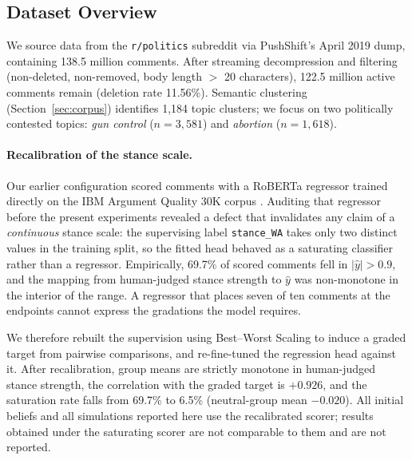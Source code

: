 \begingroup\color{revgreen}

\subsection{Dataset Overview}
\label{sec:dataset}

We source data from the \texttt{r/politics} subreddit via PushShift's
\citep{baumgartner2020pushshift} April 2019 dump, containing 138.5 million comments.
After streaming decompression and filtering (non-deleted, non-removed, body length
$>$ 20 characters), 122.5 million active comments remain (deletion rate 11.56\%).
Semantic clustering (Section~\ref{sec:corpus}) identifies 1{,}184 topic clusters; we
focus on two politically contested topics: \emph{gun control} ($n = 3{,}581$) and
\emph{abortion} ($n = 1{,}618$).

\paragraph{Recalibration of the stance scale.}
Our earlier configuration scored comments with a RoBERTa regressor trained directly on
the IBM Argument Quality 30K corpus \citep{gretz2020argq}. Auditing that regressor
before the present experiments revealed a defect that invalidates any claim of a
\emph{continuous} stance scale: the supervising label \texttt{stance\_WA} takes only two
distinct values in the training split, so the fitted head behaved as a saturating
classifier rather than a regressor. Empirically, 69.7\% of scored comments fell in
$|\hat{y}| > 0.9$, and the mapping from human-judged stance strength to $\hat{y}$ was
non-monotone in the interior of the range. A regressor that places seven of ten comments
at the endpoints cannot express the gradations the model requires.

We therefore rebuilt the supervision using Best--Worst Scaling to induce a graded target
from pairwise comparisons, and re-fine-tuned the regression head against it. After
recalibration, group means are strictly monotone in human-judged stance strength, the
correlation with the graded target is $+0.926$, and the saturation rate falls from
69.7\% to 6.5\% (neutral-group mean $-0.020$). All initial beliefs and all simulations
reported here use the recalibrated scorer; results obtained under the saturating scorer
are not comparable to them and are not reported.

